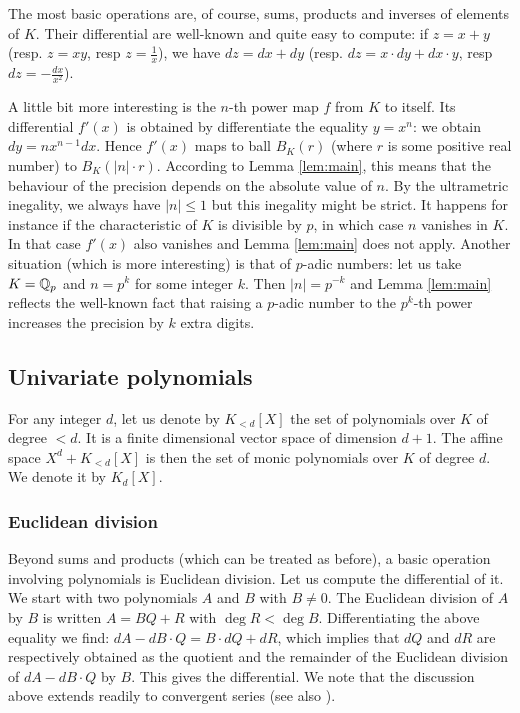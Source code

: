 \documentclass{lms}
\begin{document}
The most basic operations are, of course, sums, products and inverses of 
elements of $K$. Their differential are well-known and quite easy to 
compute: if $z = x + y$ (resp. $z = xy$, resp $z = \frac 1 x$), we have 
$dz = dx + dy$ (resp. $dz = x \cdot dy + dx \cdot y$, resp $dz = - 
\frac{dx}{x^2}$).

A little bit more interesting is the $n$-th power map $f$ from $K$ to 
itself. Its differential $f'(x)$ is obtained by differentiate the 
equality $y = x^n$: we obtain $dy = n x^{n-1} dx$.
Hence $f'(x)$ maps to ball $B_K(r)$ (where $r$ is some positive real 
number) to $B_K(|n|{\cdot} r)$. According to Lemma \ref{lem:main}, this 
means that the behaviour of the precision depends on the absolute value 
of $n$. By the ultrametric inegality, we always have $|n| \leq 1$ but 
this inegality might be strict. It happens for instance if the 
characteristic of $K$ is divisible by $p$, in which case $n$ vanishes in 
$K$. In that case $f'(x)$ also vanishes and Lemma \ref{lem:main} does 
not apply. 
Another situation (which is more interesting) is that of $p$-adic 
numbers: let us take $K = \mathbb Q_p$ and $n = p^k$ for some integer $k$. Then
$|n| = p^{-k}$ and Lemma \ref{lem:main} reflects the well-known fact that
raising a $p$-adic number to the $p^k$-th power increases the precision 
by $k$ extra digits.

\subsection{Univariate polynomials}

For any integer $d$, let us denote by $K_{< d}[X]$ the set of 
polynomials over $K$ of degree $< d$. It is a finite dimensional vector 
space of dimension $d+1$. The affine space $X^d + K_{< d}[X]$ is then 
the set of monic polynomials over $K$ of degree $d$. We denote it by 
$K_d[X]$.

\subsubsection*{Euclidean division}

Beyond sums and products (which can be treated as before), a basic 
operation involving polynomials is Euclidean division. Let us compute 
the differential of it. We start with two polynomials $A$ and $B$ with 
$B \neq 0$. The Euclidean division of $A$ by $B$ is written $A = BQ + R$ 
with $\deg R < \deg B$. Differentiating the above equality we find: 
$dA - dB \cdot Q = B \cdot dQ + dR$,
which implies that $dQ$ and $dR$ are respectively obtained as the 
quotient and the remainder of the Euclidean division of $dA - dB \cdot 
Q$ by $B$. This gives the differential. We note that the discussion 
above extends readily to convergent series (see also 
\cite{Caruso-Lubicz}).
\end{document}
